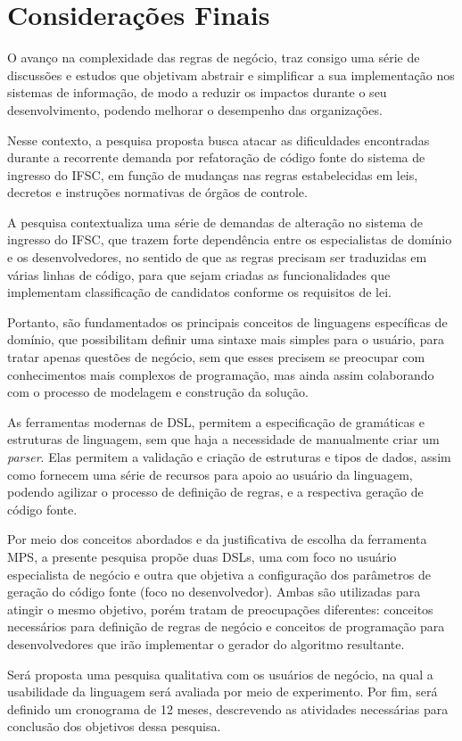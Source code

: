 \chapter{Considerações Finais}
\label{chap:consideracoes}

O avanço na complexidade das regras de negócio, traz consigo uma série de discussões e estudos que objetivam abstrair e simplificar a sua implementação nos sistemas de informação, de modo a reduzir os impactos durante o seu desenvolvimento, podendo melhorar o desempenho das organizações.   

Nesse contexto, a pesquisa proposta busca atacar as dificuldades encontradas durante a recorrente demanda por refatoração de código fonte do sistema de ingresso do \gls{IFSC}, em função de mudanças nas regras estabelecidas em leis, decretos e instruções normativas de órgãos de controle.

A pesquisa contextualiza uma série de demandas de alteração no sistema de ingresso do \gls{IFSC}, que trazem forte dependência entre os especialistas de domínio e os desenvolvedores, no sentido de que as regras precisam ser traduzidas em várias linhas de código, para que sejam criadas as funcionalidades que implementam classificação de candidatos conforme os requisitos de lei.

Portanto, são fundamentados os principais conceitos de linguagens específicas de domínio, que possibilitam definir uma sintaxe mais simples para o usuário, para tratar apenas questões de negócio, sem que esses precisem se preocupar com conhecimentos mais complexos de programação, mas ainda assim colaborando com o processo de modelagem e construção da solução.

As ferramentas modernas de \gls{DSL}, permitem a especificação de gramáticas e estruturas de linguagem, sem que haja a necessidade de manualmente criar um \textit{parser}. Elas permitem a validação e criação de estruturas e tipos de dados, assim como fornecem uma série de recursos para apoio ao usuário da linguagem, podendo agilizar o processo de definição de regras, e a respectiva geração de código fonte.

Por meio dos conceitos abordados e da justificativa de escolha da ferramenta \gls{MPS}, a presente pesquisa propõe duas \gls{DSL}s, uma com foco no usuário especialista de negócio e outra que objetiva a configuração dos parâmetros de geração do código fonte (foco no desenvolvedor). Ambas são utilizadas para atingir o mesmo objetivo, porém tratam de preocupações diferentes: conceitos necessários para definição de regras de negócio e conceitos de programação para desenvolvedores que irão implementar o gerador do algoritmo resultante.

Será proposta uma pesquisa qualitativa com os usuários de negócio, na qual a usabilidade da linguagem será avaliada por meio de experimento. Por fim, será definido um cronograma de 12 meses, descrevendo as atividades necessárias para conclusão dos objetivos dessa pesquisa.